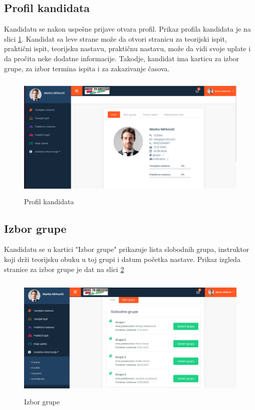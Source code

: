 \subsection{Profil kandidata}

Kandidatu se nakon uspešne prijave otvara profil. Prikaz profila kandidata je na slici \ref{fig:profil}. Kandidat sa leve strane može da otvori stranicu za teorijski ispit, praktični ispit, teorijsku nastavu, praktičnu nastavu, može da vidi svoje uplate i da pročita neke dodatne informacije. Takodje, kandidat ima karticu za izbor grupe, za izbor termina ispita i za zakazivanje časova.

\begin{figure}[H]
  \begin{center}
      \includegraphics[width=140mm, height=60mm]{UI/UI_profil_kandidata.png}
  \end{center}
  \caption {Profil kandidata}
  \label{fig:profil}

\end{figure}

\subsection{Izbor grupe}

Kandidatu se u kartici "Izbor grupe" prikazuje lista slobodnih grupa, instruktor koji drži teorijsku obuku u toj grupi i datum početka nastave. Prikaz izgleda stranice za izbor grupe je dat na slici \ref{fig:ui_izbor_grupe}

\begin{figure}[H]
  \begin{center}
      \includegraphics[width=140mm, height=60mm]{UI/UI_izbor_grupe.png}
  \end{center}
  \caption {Izbor grupe}
  \label{fig:ui_izbor_grupe}

\end{figure}

